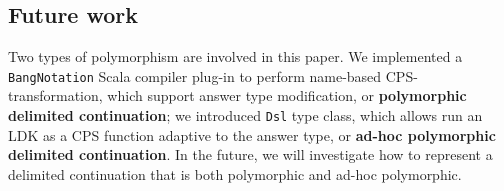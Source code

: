 \subsection{Future work}

Two types of polymorphism are involved in this paper. We implemented a \lstinline{BangNotation} Scala compiler plug-in to perform name-based CPS-transformation, which support answer type modification, or \textbf{polymorphic delimited continuation}; we introduced \lstinline{Dsl} type class, which allows run an LDK as a CPS function adaptive to the answer type, or \textbf{ad-hoc polymorphic delimited continuation}. In the future, we will investigate how to represent a delimited continuation that is both polymorphic and ad-hoc polymorphic.
